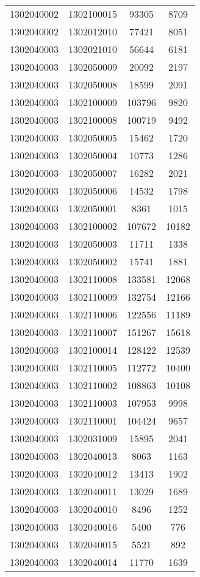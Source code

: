\begin{longtable}[h]{llcc}
		1302040002 & 1302100015 & 93305 & 8709\\
		1302040002 & 1302012010 & 77421 & 8051\\
		1302040003 & 1302021010 & 56644 & 6181\\
		1302040003 & 1302050009 & 20092 & 2197\\
		1302040003 & 1302050008 & 18599 & 2091\\
		1302040003 & 1302100009 & 103796 & 9820\\
		1302040003 & 1302100008 & 100719 & 9492\\
		1302040003 & 1302050005 & 15462 & 1720\\
		1302040003 & 1302050004 & 10773 & 1286\\
		1302040003 & 1302050007 & 16282 & 2021\\
		1302040003 & 1302050006 & 14532 & 1798\\
		1302040003 & 1302050001 & 8361 & 1015\\
		1302040003 & 1302100002 & 107672 & 10182\\
		1302040003 & 1302050003 & 11711 & 1338\\
		1302040003 & 1302050002 & 15741 & 1881\\
		1302040003 & 1302110008 & 133581 & 12068\\
		1302040003 & 1302110009 & 132754 & 12166\\
		1302040003 & 1302110006 & 122556 & 11189\\
		1302040003 & 1302110007 & 151267 & 15618\\
		1302040003 & 1302100014 & 128422 & 12539\\
		1302040003 & 1302110005 & 112772 & 10400\\
		1302040003 & 1302110002 & 108863 & 10108\\
		1302040003 & 1302110003 & 107953 & 9998\\
		1302040003 & 1302110001 & 104424 & 9657\\
		1302040003 & 1302031009 & 15895 & 2041\\
		1302040003 & 1302040013 & 8063 & 1163\\
		1302040003 & 1302040012 & 13413 & 1902\\
		1302040003 & 1302040011 & 13029 & 1689\\
		1302040003 & 1302040010 & 8496 & 1252\\
		1302040003 & 1302040016 & 5400 & 776\\
		1302040003 & 1302040015 & 5521 & 892\\
		1302040003 & 1302040014 & 11770 & 1639\\

\end{longtable}
